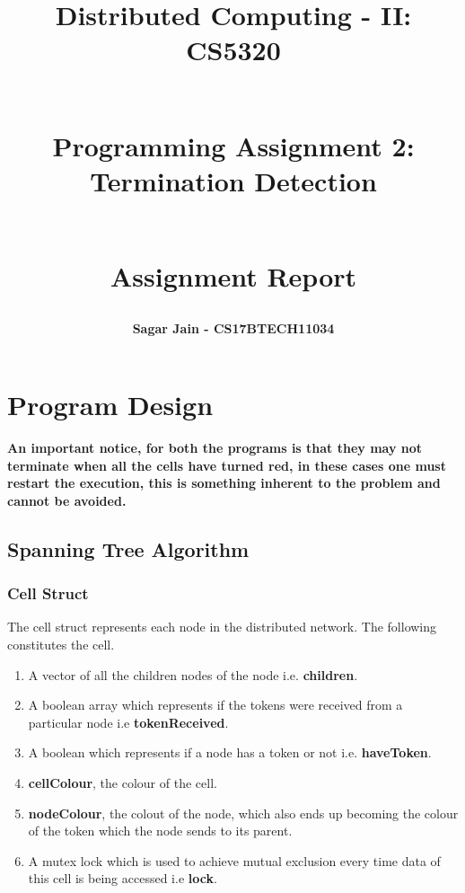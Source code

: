 \documentclass[a4paper,12pt]{report}
\begin{document}
\title{
\textbf{Distributed Computing - II: CS5320}\\~\\
\begin{huge}
\textbf{Programming Assignment 2:\\Termination Detection
\\~\\}
\end{huge}
\begin{huge}
\textbf{Assignment Report}
\end{huge}
}
\author{\textbf{Sagar Jain - CS17BTECH11034}\\}
\maketitle
\begin{large}
\tableofcontents
\end{large}
\newpage
\section{Program Design}
\textbf{An important notice, for both the programs is that they may not terminate when all the cells have turned red, in these cases one must restart the execution, this is something inherent to the problem and cannot be avoided.}
\subsection{Spanning Tree Algorithm}
\subsubsection{Cell Struct}
The cell struct represents each node in the distributed network. The following constitutes the cell.
\begin{enumerate}
\item A vector of all the children nodes of the node i.e. \textbf{children}.
\item A boolean array which represents if the tokens were received from a particular node i.e \textbf{tokenReceived}.
\item A boolean which represents if a node has a token or not i.e. \textbf{haveToken}.
\item \textbf{cellColour}, the colour of the cell.
\item \textbf{nodeColour}, the colout of the node, which also ends up becoming the colour of the token which the node sends to its parent.
\item A mutex lock which is used to achieve mutual exclusion every time data of this cell is being accessed i.e \textbf{lock}.
\end{enumerate}
\end{document}
